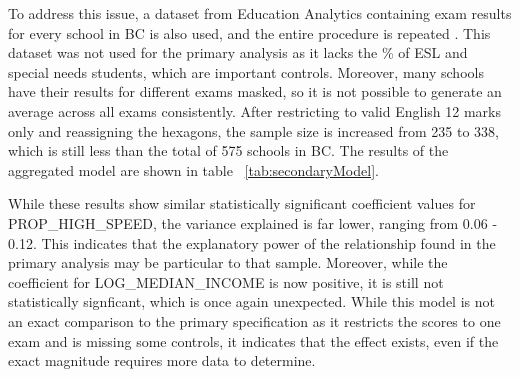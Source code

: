 \documentclass[stu, floatsintext]{apa7}
\begin{document}
    To address this issue, a dataset from Education Analytics containing exam results for every school in BC is also used, and the entire procedure is repeated \autocite{secondary2020}. This dataset was not used for the primary analysis as it lacks the \% of ESL and special needs students, which are important controls. Moreover, many schools have their results for different exams masked, so it is not possible to generate an average across all exams consistently. After restricting to valid English 12 marks only and reassigning the hexagons, the sample size is increased from 235 to 338, which is still less than the total of 575 schools in BC. The results of the aggregated model are shown in table ~\ref{tab:secondaryModel}. 
    
    While these results show similar statistically significant coefficient values for PROP\_HIGH\_SPEED, the variance explained is far lower, ranging from 0.06 - 0.12. This indicates that the explanatory power of the relationship found in the primary analysis may be particular to that sample. Moreover, while the coefficient for LOG\_MEDIAN\_INCOME is now positive, it is still not statistically signficant, which is once again unexpected. While this model is not an exact comparison to the primary specification as it restricts the scores to one exam and is missing some controls, it indicates that the effect exists, even if the exact magnitude requires more data to determine.  
\end{document}
